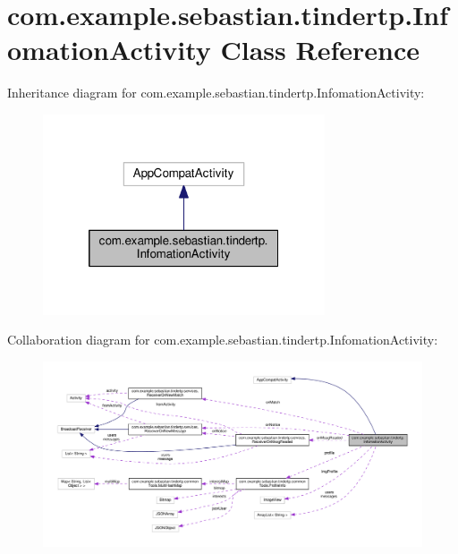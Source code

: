 \hypertarget{classcom_1_1example_1_1sebastian_1_1tindertp_1_1InfomationActivity}{}\section{com.\+example.\+sebastian.\+tindertp.\+Infomation\+Activity Class Reference}
\label{classcom_1_1example_1_1sebastian_1_1tindertp_1_1InfomationActivity}


Inheritance diagram for com.\+example.\+sebastian.\+tindertp.\+Infomation\+Activity\+:\nopagebreak
\begin{figure}[H]
\begin{center}
\leavevmode
\includegraphics[width=236pt]{classcom_1_1example_1_1sebastian_1_1tindertp_1_1InfomationActivity__inherit__graph}
\end{center}
\end{figure}


Collaboration diagram for com.\+example.\+sebastian.\+tindertp.\+Infomation\+Activity\+:\nopagebreak
\begin{figure}[H]
\begin{center}
\leavevmode
\includegraphics[width=350pt]{classcom_1_1example_1_1sebastian_1_1tindertp_1_1InfomationActivity__coll__graph}
\end{center}
\end{figure}

